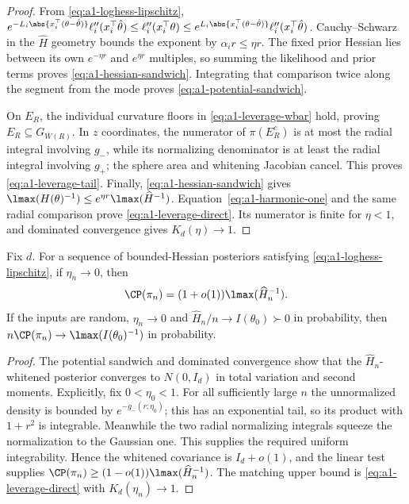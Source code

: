 \documentclass[../../main.tex]{subfiles}
\begin{document}
\begin{proof}
From \eqref{eq:a1-loghess-lipschitz},
$e^{-L_i\abs{x_i^\top(\theta-\hat\theta)}}\ell_i''(x_i^\top\hat\theta)
\le\ell_i''(x_i^\top\theta)\le
e^{L_i\abs{x_i^\top(\theta-\hat\theta)}}\ell_i''(x_i^\top\hat\theta)$.
Cauchy--Schwarz in the $\widehat H$ geometry bounds the exponent by $\alpha_i r\le\eta r$.
The fixed prior Hessian lies between its own $e^{-\eta r}$ and $e^{\eta r}$ multiples, so summing
the likelihood and prior terms proves \eqref{eq:a1-hessian-sandwich}. Integrating that comparison
twice along the segment from the mode proves \eqref{eq:a1-potential-sandwich}.

On $E_R$, the individual curvature floors in \eqref{eq:a1-leverage-wbar} hold, proving
$E_R\subseteq G_{\bar W(R)}$. In $z$ coordinates, the numerator of $\pi(E_R^c)$ is at most the
radial integral involving $g_-$, while its normalizing denominator is at least the radial integral
involving $g_+$; the sphere area and whitening Jacobian cancel. This proves
\eqref{eq:a1-leverage-tail}. Finally, \eqref{eq:a1-hessian-sandwich} gives
$\lmax(H(\theta)^{-1})\le e^{\eta r}\lmax(\widehat H^{-1})$.
Equation~\eqref{eq:a1-harmonic-one} and the same radial comparison prove
\eqref{eq:a1-leverage-direct}. Its numerator is finite for $\eta<1$, and dominated convergence
gives $K_d(\eta)\to1$.
\end{proof}

\begin{corollary}
\label{cor:a1-leverage-asymptotic}
Fix $d$. For a sequence of bounded-Hessian posteriors satisfying
\eqref{eq:a1-loghess-lipschitz}, if $\eta_n\to0$, then
\begin{equation}\label{eq:a1-leverage-asymptotic}
 \CP(\pi_n)=(1+o(1))\lmax(\widehat H_n^{-1}).
\end{equation}
If the inputs are random, $\eta_n\to0$ and $\widehat H_n/n\to I(\theta_0)\succ0$ in probability,
then $n\CP(\pi_n)\to\lmax(I(\theta_0)^{-1})$ in probability.
\end{corollary}

\begin{proof}
The potential sandwich and dominated convergence show that the $\widehat H_n$-whitened posterior
converges to $N(0,I_d)$ in total variation and second moments. Explicitly, fix
$0<\eta_0<1$. For all sufficiently large $n$ the unnormalized density is bounded by
$e^{-g_-(r;\eta_0)}$; this has an exponential tail, so its product with $1+r^2$ is integrable.
Meanwhile the two radial normalizing integrals squeeze the normalization to the Gaussian one.
This supplies the required uniform integrability. Hence the whitened covariance is $I_d+o(1)$,
and the linear test supplies
$\CP(\pi_n)\ge(1-o(1))\lmax(\widehat H_n^{-1})$. The matching upper bound is
\eqref{eq:a1-leverage-direct} with $K_d(\eta_n)\to1$.
\end{proof}
\end{document}
